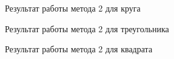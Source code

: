 \documentclass[a4paper]{article}
\begin{document}
\begin{figure}[h!]
  \caption{Результат работы метода 2 для круга}
  \label{s1}
\end{figure}
\begin{figure}[h!]
  \caption{Результат работы метода 2 для треугольника}
  \label{s2}
\end{figure}
\begin{figure}[h!]
  \caption{Результат работы метода 2 для квадрата}
  \label{s3}
\end{figure}
\end{document}
